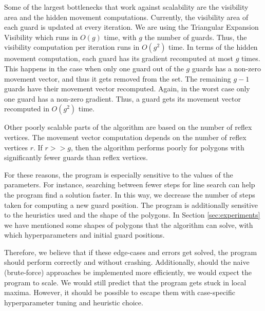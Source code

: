 Some of the largest bottlenecks that work against scalability are the visibility area and the hidden movement computations. Currently, the visibility area of each guard is updated at every iteration. We are using the Triangular Expansion Visibility \cite{DBLP:journals/corr/BungiuHHHK14} which runs in $O(g)$ time, with $g$ the number of guards. Thus, the visibility computation per iteration runs in $O(g^2)$ time. 
In terms of the hidden movement computation, each guard has its gradient recomputed at most $g$ times. This happens in the case when only one guard out of the $g$ guards has a non-zero movement vector, and thus it gets removed from the set. The remaining $g - 1$ guards have their movement vector recomputed. Again, in the worst case only one guard has a non-zero gradient. Thus, a guard gets its movement vector recomputed in $O(g^2)$ time.

Other poorly scalable parts of the algorithm are based on the number of reflex vertices. The movement vector computation depends on the number of reflex vertices $r$. If $r >> g$, then the algorithm performs poorly for polygons with significantly fewer guards than reflex vertices.

For these reasons, the program is especially sensitive to the values of the parameters. For instance, searching between fewer steps for line search can help the program find a solution faster. In this way, we decrease the number of steps taken for computing a new guard position. 
The program is additionally sensitive to the heuristics used and the shape of the polygons. In Section \ref{sec:experiments} we have mentioned some shapes of polygons that the algorithm can solve, with which hyperparameters and initial guard positions.

Therefore, we believe that if these edge-cases and errors get solved, the program should perform correctly and without crashing. Additionally, should the naive (brute-force) approaches be implemented more efficiently, we would expect the program to scale. We would still predict that the program gets stuck in local maxima. However, it should be possible to escape them with case-specific hyperparameter tuning and heuristic choice.





